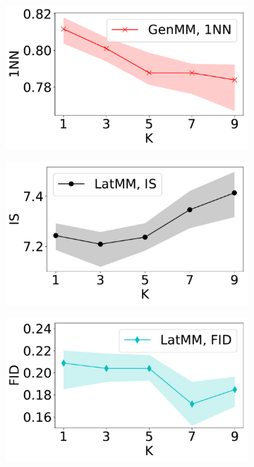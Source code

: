 \begin{figure}[!tp]
\begin{subfigure}{.24\textwidth}
  \end{subfigure}
  \centering
  \begin{subfigure}{0.24\textwidth}
    \centering
    \includegraphics[width=1\linewidth]{images/mnist/scores/std1EMGM-NM/EMGM-NM-1NN-K.pdf}
  \end{subfigure}
  \centering
  \begin{subfigure}{.24\textwidth}
    \centering
    \includegraphics[width=1\linewidth]{images/mnist/scores/std1EMGM-SM/EMGM-SM-IS-K.pdf}
  \end{subfigure}
  \centering
  \begin{subfigure}{.24\textwidth}
    \centering
    \includegraphics[width=1\linewidth]{images/mnist/scores/std1EMGM-SM/EMGM-SM-FID-K.pdf}

\end{subfigure}
\end{figure}
